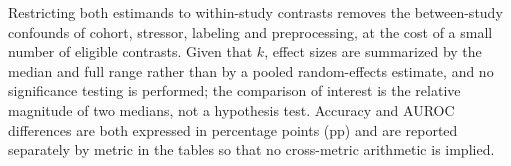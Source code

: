 Restricting both estimands to within-study contrasts removes the between-study confounds of
cohort, stressor, labeling and preprocessing, at the cost of a small number of eligible
contrasts. Given that $k$, effect sizes are summarized by the median and full range rather
than by a pooled random-effects estimate, and no significance testing is performed; the
comparison of interest is the relative magnitude of two medians, not a hypothesis test.
Accuracy and AUROC differences are both expressed in percentage points (pp) and are reported
separately by metric in the tables so that no cross-metric arithmetic is implied.
